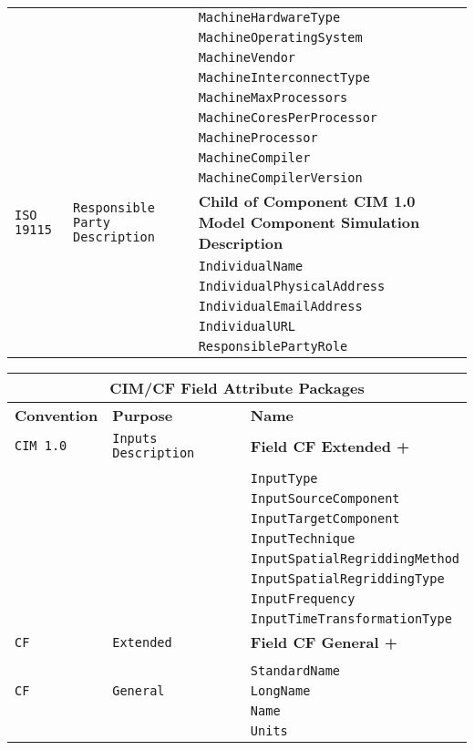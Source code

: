 \begin{tabular}{|p{4cm}|p{4cm}|p{8cm}|}
     & & {\tt MachineHardwareType} \\
     & & {\tt MachineOperatingSystem} \\
     & & {\tt MachineVendor} \\
     & & {\tt MachineInterconnectType} \\
     & & {\tt MachineMaxProcessors} \\
     & & {\tt MachineCoresPerProcessor} \\
     & & {\tt MachineProcessor} \\
     & & {\tt MachineCompiler} \\
     & & {\tt MachineCompilerVersion} \\
\hline
{\tt ISO 19115} & {\tt Responsible Party Description} & {\bf Child of Component CIM 1.0 Model Component Simulation Description}\\
     & & {\tt IndividualName} \\
     & & {\tt IndividualPhysicalAddress} \\
     & & {\tt IndividualEmailAddress} \\
     & & {\tt IndividualURL} \\
     & & {\tt ResponsiblePartyRole} \\
\hline
\end{tabular}

\vspace{5pt}
\label{CIMFieldAttributePackages}
\begin{tabular}{|p{4cm}|p{4cm}|p{6cm}|}
\hline
\multicolumn{3}{|c|}{{\bf \large CIM/CF Field Attribute Packages}} \\
\hline\hline
{\bf Convention} & {\bf Purpose} & {\bf Name} \\
\hline\hline
{\tt CIM 1.0} & {\tt Inputs Description} & {\bf Field CF Extended +} \\
& & \\
& & {\tt InputType}  \\
 & & {\tt InputSourceComponent} \\ 
 & & {\tt InputTargetComponent} \\ 
 & & {\tt InputTechnique} \\ 
 & & {\tt InputSpatialRegriddingMethod} \\ 
 & & {\tt InputSpatialRegriddingType} \\ 
 & & {\tt InputFrequency} \\ 
 & & {\tt InputTimeTransformationType} \\ 
\hline
{\tt CF} & {\tt Extended} & {\bf Field CF General +} \\
& & \\
& & {\tt StandardName}\\ 
\hline
{\tt CF} & {\tt General} & {\tt LongName}\\
     & & {\tt Name} \\
     & & {\tt Units}  \\
\hline
\end{tabular}

